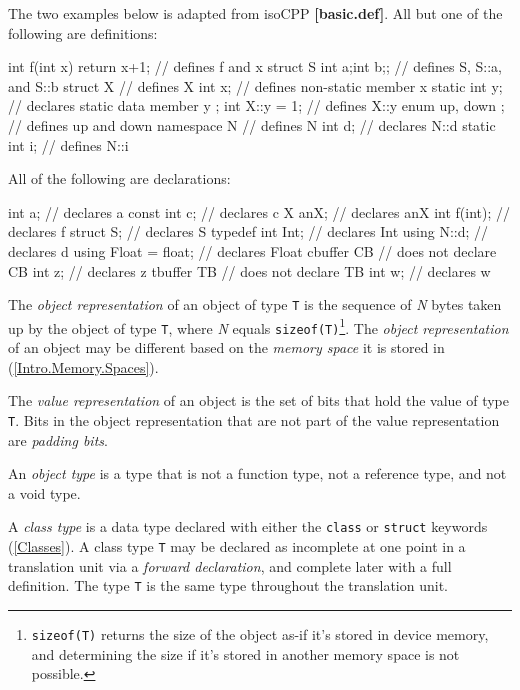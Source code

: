 \p The two examples below is adapted from \gls{isoCPP} \textbf{[basic.def]}. All
but one of the following are definitions:
\begin{HLSL}
int f(int x) { return x+1; } // defines f and x
struct S {int a;int b;};     // defines S, S::a, and S::b
struct X {                   // defines X
  int x;                     // defines non-static member x
  static int y;              // declares static data member y
};
int X::y = 1;                // defines X::y
enum { up, down };           // defines up and down
namespace N {                // defines N
int d;                       // declares N::d
static int i;                // defines N::i
}
\end{HLSL}

\p All of the following are declarations:
\begin{HLSL}
int a;                       // declares a
const int c;                 // declares c
X anX;                       // declares anX
int f(int);                  // declares f
struct S;                    // declares S
typedef int Int;             // declares Int
using N::d;                  // declares d
using Float = float;         // declares Float
cbuffer CB {                 // does not declare CB
  int z;                     // declares z
}
tbuffer TB {                 // does not declare TB
  int w;                     // declares w
}
\end{HLSL}


\p The \textit{object representation} of an object of type \texttt{T} is the
sequence of \textit{N} bytes taken up by the object of type \texttt{T}, where
\textit{N} equals \texttt{sizeof(T)}\footnote{\texttt{sizeof(T)} returns the
size of the object as-if it's stored in device memory, and determining the size
if it's stored in another memory space is not possible.}. The \textit{object
representation} of an object may be different based on the \textit{memory space}
it is stored in (\ref{Intro.Memory.Spaces}).

\p The \textit{value representation} of an object is the set of bits that hold
the value of type \texttt{T}. Bits in the object representation that are not
part of the value representation are \textit{padding bits}.

\p An \textit{object type} is a type that is not a function type, not a
reference type, and not a void type.

\p A \textit{class type} is a data type declared with either the \texttt{class}
or \texttt{struct} keywords (\ref{Classes}). A class type \texttt{T} may be
declared as incomplete at one point in a translation unit via a \textit{forward
declaration}, and complete later with a full definition. The type \texttt{T} is
the same type throughout the translation unit.

